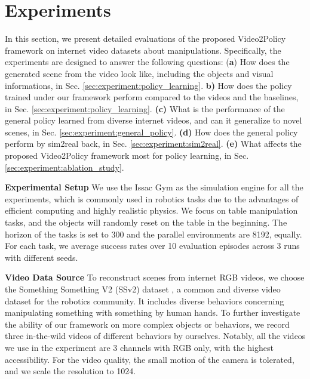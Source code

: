 \section{Experiments}
\label{sec:experiment}

In this section, we present detailed evaluations of the proposed Video2Policy framework on internet video datasets about manipulations. Specifically, the experiments are designed to answer the following questions: 
(\textbf{a}) How does the generated scene from the video look like, including the objects and visual informations, in Sec. \ref{sec:experiment:policy_learning}. 
\textbf{b)} How does the policy trained under our framework perform compared to the videos and the baselines, in Sec. \ref{sec:experiment:policy_learning}. \textbf{(c)} What is the performance of the general policy learned from diverse internet videos, and can it generalize to novel scenes, in Sec. \ref{sec:experiment:general_policy}. \textbf{(d)} How does the general policy perform by sim2real back, in Sec. \ref{sec:experiment:sim2real}.
\textbf{(e)} What affects the proposed Video2Policy framework most for policy learning, in Sec. \ref{sec:experiment:ablation_study}. 

\textbf{Experimental Setup} We use the Issac Gym \citep{makoviychuk2021isaac} as the simulation engine for all the experiments, which is commonly used in robotics tasks due to the advantages of efficient computing and highly realistic physics. We focus on table manipulation tasks, and the objects will randomly reset on the table in the beginning. The horizon of the tasks is set to 300 and the parallel environments are 8192, equally. For each task, we average success rates over 10 evaluation episodes across 3 runs with different seeds. 

\textbf{Video Data Source} To reconstruct scenes from internet RGB videos, we choose the Something Something V2 (SSv2) dataset \citep{goyal2017something}, a common and diverse video dataset for the robotics community. It includes diverse behaviors concerning manipulating something with something by human hands. To further investigate the ability of our framework on more complex objects or behaviors, we record three in-the-wild videos of different behaviors by ourselves. 
Notably, all the videos we use in the experiment are 3 channels with RGB only, with the highest accessibility. For the video quality, the small motion of the camera is tolerated, and we scale the resolution to 1024.

